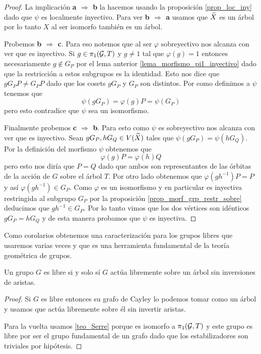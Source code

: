 \documentclass[tesis.tex]{subfiles}
\begin{document}
\begin{proof}	
		 La implicación \textbf{a $\Rightarrow$ b} la hacemos usando la proposición \ref{prop_loc_iny} dado que $\psi$ es localmente inyectivo.
		 Para ver \textbf{b $\Rightarrow$ a} usamos que $\widetilde X$ es un árbol por lo tanto $X$ al ser isomorfo también es un árbol.
		 
		 Probemos \textbf{b $\Rightarrow$ c}. 
		 Para eso notemos que al ser $\varphi$ sobreyectivo nos alcanza con ver que es inyectivo.
		 Si $g \in \pi_1({\cal G}, T)$ y $g \neq 1$ tal que $\varphi(g)= 1$ entonces necesariamente $g \notin G_P$ por el lema anterior \ref{lema_morfismo_pi1_inyectivo} dado que la restricción a estos subgrupos es la identidad.
		 Esto nos dice que $g G_P P \neq G_P P$ dado que los cosets $gG_P$ y $G_P$ son distintos. Por como definimos a $\psi$ tenemos que 
		 \[
		 \psi (gG_P ) = \varphi(g) P  = \psi(G_P )
		 \] 
		 pero esto contradice que $\psi$ sea un isomorfismo.
		 
		 Finalmente probemos \textbf{c $\Rightarrow$ b}. 
		 Para esto como $\psi$ es sobreyectivo nos alcanza con ver que es inyectivo.
		 Sean $gG_P, hG_Q \in V(\widetilde X)$ tales que $\psi(gG_P) = \psi(hG_Q)$.
		 Por la definición del morfismo $\psi$ obtenemos que 
		 \[
		 	\varphi(g)P = \varphi(h)Q
		 \]
		 pero esto nos diría que $P = Q$ dado que ambos son representantes de las órbitas de la acción de $G$ sobre el árbol $T$. 
		 Por otro lado obtenemos que $\varphi(g h^{-1}) P  =  P$ y así $\varphi(gh^{-1}) \in G_P$. 
		 Como $\varphi$ es un isomorfismo y en particular es inyectiva restringida al subgrupo $G_P$ por la proposición \ref{prop_morf_grp_restr_sobre} deducimos que $gh^{-1} \in G_P$.
		 Por lo tanto vimos que los dos vértices son idénticos $gG_P  = hG_Q$ y de esta manera probamos que $\psi$ es inyectiva.
\end{proof}

Como corolarios obtenemos una caracterización para los grupos libres que usaremos varias veces y que es una herramienta fundamental de la teoría geométrica de grupos.

\begin{coro}\label{coro_libre_sii_actua_arbol}
	Un grupo $G$ es libre si y solo sí $G$ actúa libremente sobre un árbol sin inversiones de aristas. 
\end{coro}
\begin{proof}
	Si $G$ es libre entonces su grafo de Cayley lo podemos tomar como un árbol y usamos que actúa libremente sobre él sin invertir aristas.
	
	Para la vuelta usamos \ref{teo_Serre} porque es isomorfo a $\pi_1({\cal G}, T)$ y este grupo es libre por ser el grupo fundamental de un grafo dado que los estabilizadores son triviales por hipótesis.
\end{proof}
\end{document}
